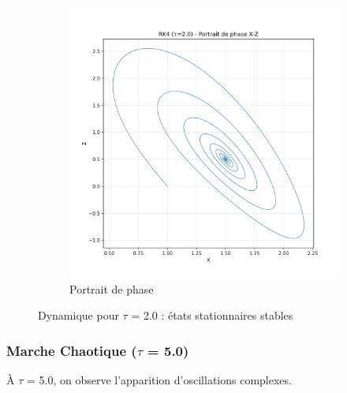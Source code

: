 \begin{figure}[H]
\begin{subfigure}[b]{0.3\textwidth}
        \includegraphics[width=\textwidth]{figures/rk4/rk4_tau2.0_phase}
        \caption{Portrait de phase}
    \end{subfigure}
    \caption{Dynamique pour $\tau$ = 2.0 : états stationnaires stables}
    \label{fig:rk4_tau2.0}
\end{figure}

\subsubsection{Marche Chaotique ($\tau$ = 5.0)}
À $\tau$ = 5.0, on observe l'apparition d'oscillations complexes.

